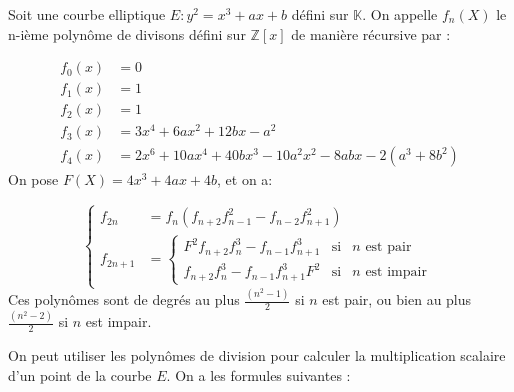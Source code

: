 \documentclass[12pt]{article}
\begin{document}
\begin{defi}
Soit une courbe elliptique $E : y^2 = x^3 + ax+b$ défini sur $\mathbb{K}$. On appelle $f_n(X)$ le n-ième polynôme de divisons défini sur $\mathbb{Z}[x]$ de manière récursive par : 


\begin{align*}
f_0(x) &= 0 \\
f_1(x) &= 1 \\
f_2(x) &= 1 \\
f_3(x) &= 3x^4 + 6ax^2 +12bx - a^2 \\
f_4(x) &= 2x^6 + 10ax^4 +40bx^3 - 10a^2x^2 - 8abx - 2(a^3 + 8b^2)
\end{align*}
On pose $F(X)= 4x^3 + 4ax + 4b$, et on a:

\begin{equation}
\left\lbrace
\begin{array}{ll}
f_{2n}& =  f_n(f_{n+2}f_{n-1}^2 - f_{n-2}f_{n+1}^2)   \\
f_{2n+1}& = \left\lbrace 
\begin{array}{ccc}
F^2f_{n+2}f_n^3 - f_{n-1}f_{n+1}^3 & \mbox{si} & n \text{ est pair}\\
f_{n+2}f_n^3 - f_{n-1}f_{n+1}^3F^2 & \mbox{si} & n \text{ est impair} \end{array}\right.

\end{array} \right.
\end{equation} 
Ces polynômes sont de degrés au plus $\frac{(n^2 -1)}{2}$ si $n$ est pair, ou bien  au plus $\frac{(n^2 -2)}{2}$ si $n$ est impair.
\end{defi}


On peut utiliser les polynômes de division pour calculer la multiplication scalaire d'un point de la courbe $E$.
On a les formules suivantes : 
\end{document}
